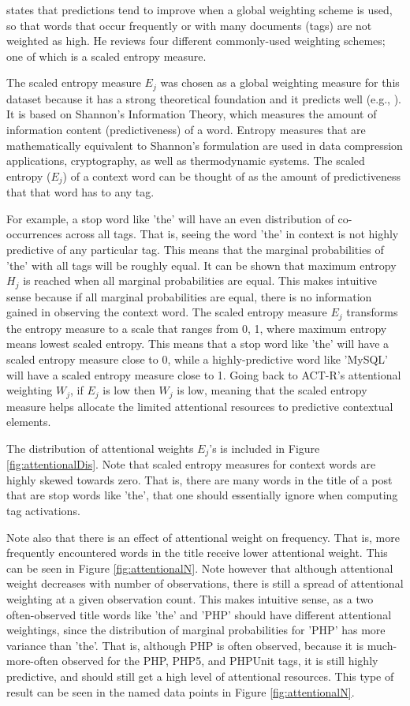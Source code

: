 \documentclass[10pt,letterpaper]{article}
\begin{document}
\cite{Dumais1991} states that predictions tend to improve when a global weighting scheme is used, so that words that occur frequently or with many documents (tags) are not weighted as high.
He reviews four different commonly-used weighting schemes; one of which is a scaled entropy measure.

The scaled entropy measure $E_{j}$ was chosen as a global weighting measure for this dataset because it has a strong theoretical foundation and it predicts well (e.g., \cite{Dumais1991}).
It is based on Shannon's Information Theory, which measures the amount of information content (predictiveness) of a word.
Entropy measures that are mathematically equivalent to Shannon's formulation are used in data compression applications, cryptography, as well as thermodynamic systems.
The scaled entropy ($E_{j}$) of a context word can be thought of as the amount of predictiveness that that word has to any tag.

For example, a stop word like 'the' will have an even distribution of co-occurrences across all tags.
That is, seeing the word 'the' in context is not highly predictive of any particular tag.
This means that the marginal probabilities of 'the' with all tags will be roughly equal.
It can be shown that maximum entropy $H_{j}$ is reached when all marginal probabilities are equal.
This makes intuitive sense because if all marginal probabilities are equal, there is no information gained in observing the context word.
The scaled entropy measure $E_{j}$ transforms the entropy measure to a scale that ranges from 0, 1, where maximum entropy means lowest scaled entropy.
This means that a stop word like 'the' will have a scaled entropy measure close to 0, while a highly-predictive word like 'MySQL' will have a scaled entropy measure close to 1.
Going back to ACT-R's attentional weighting $W_{j}$, if $E_{j}$ is low then $W_{j}$ is low, meaning that the scaled entropy measure helps allocate the limited attentional resources to predictive contextual elements.

The distribution of attentional weights $E_{j}$'s is included in Figure \ref{fig:attentionalDis}. 
Note that scaled entropy measures for context words are highly skewed towards zero.
That is, there are many words in the title of a post that are stop words like 'the', that one should essentially ignore when computing tag activations.

Note also that there is an effect of attentional weight on frequency.
That is, more frequently encountered words in the title receive lower attentional weight.
This can be seen in Figure \ref{fig:attentionalN}.
Note however that although attentional weight decreases with number of observations, there is still a spread of attentional weighting at a given observation count.
This makes intuitive sense, as a two often-observed title words like 'the' and 'PHP' should have different attentional weightings, since the distribution of marginal probabilities for 'PHP' has more variance than 'the'.
That is, although PHP is often observed, because it is much-more-often observed for the PHP, PHP5, and PHPUnit tags, it is still highly predictive, and should still get a high level of attentional resources.
This type of result can be seen in the named data points in Figure \ref{fig:attentionalN}.
\end{document}
